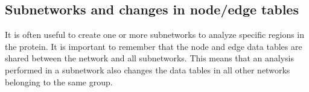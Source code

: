 \subsection{Subnetworks and changes in node/edge tables}
It is often useful to create one or more subnetworks to analyze specific regions in the protein. It is important to remember that the node and edge data tables are shared between the network and all subnetworks. This means that an analysis performed in a subnetwork also changes the data tables in all other networks belonging to the same group. 

\clearpage
{} 



